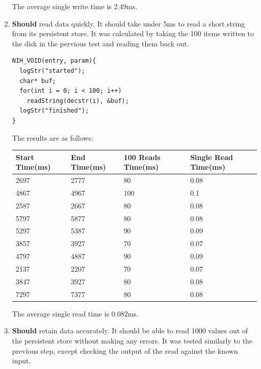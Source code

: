 \documentclass{article}
\begin{document}
\begin{enumerate}
The average single write time is 2.49ms.

\item \textbf{Should} read data quickly. It should take under 5ms to read a short string from its persistent store. It was calculated by taking the 100 items written to the disk in the pervious test and reading them back out.

\begin{tcolorbox}[colback=white,grow to left by=2.5mm,grow to right by=2.5mm,left*=0mm,right*=0mm,sharp corners]
\begin{verbatim}
NIH_VOID(entry, param){
  logStr("started");
  char* buf;
  for(int i = 0; i < 100; i++)
    readString(decstr(i), &buf);
  logStr("finished");
}
\end{verbatim}
\end{tcolorbox}

The results are as follows:
\begin{table}[H]
\begin{tabular}{|l|l|l|l|}
\hline
Start Time(ms)		&End Time(ms)				&100 Reads Time(ms)		&Single Read Time(ms)		\\ \hline
2697	 & 2777	 & 80	 & 0.08\\ \hline
4867	 & 4967	 & 100	 & 0.1\\ \hline
2587	 & 2667	 & 80	 & 0.08\\ \hline
5797	 & 5877	 & 80	 & 0.08\\ \hline
5297	 & 5387	 & 90	 & 0.09\\ \hline
3857	 & 3927	 & 70	 & 0.07\\ \hline
4797	 & 4887	 & 90	 & 0.09\\ \hline
2137	 & 2207	 & 70	 & 0.07\\ \hline
3847	 & 3927	 & 80	 & 0.08\\ \hline
7297	 & 7377	 & 80	 & 0.08\\ \hline
\end{tabular}
\end{table}

The average single read time is 0.082ms.

\item \textbf{Should} retain data accurately. It should be able to read 1000 values out of the persistent store without making any errors. It was tested similarly to the previous step, except checking the output of the read against the known input.


\end{enumerate}
\end{document}
